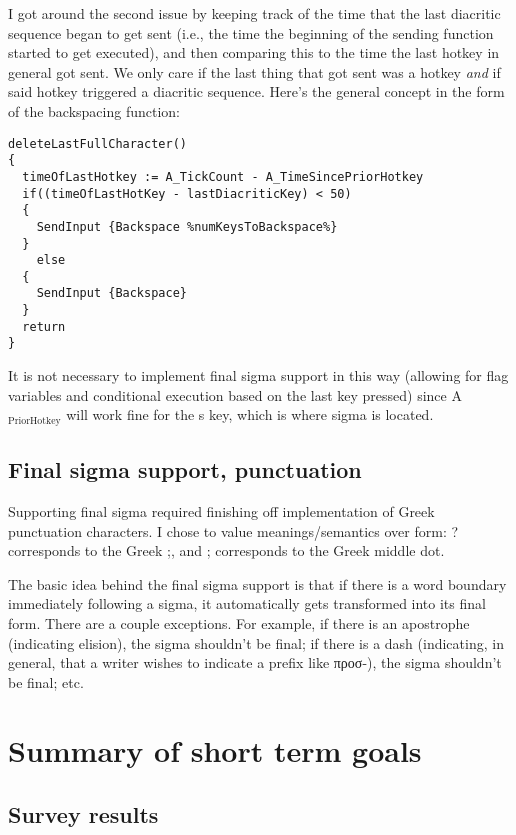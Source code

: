 \documentclass[11pt]{article}
\begin{document}
I got around the second issue by keeping track of the time that the last diacritic sequence began to get sent (i.e., the time the beginning of the sending function started to get executed), and then comparing this to the time the last hotkey in general got sent. We only care if the last thing that got sent was a hotkey \emph{and} if said hotkey triggered a diacritic sequence. Here's the general concept in the form of the backspacing function:

\begin{verbatim}
deleteLastFullCharacter()
{
  timeOfLastHotkey := A_TickCount - A_TimeSincePriorHotkey
  if((timeOfLastHotKey - lastDiacriticKey) < 50)
  {
    SendInput {Backspace %numKeysToBackspace%}
  }
    else
  {
    SendInput {Backspace}
  }
  return
}
\end{verbatim}

It is not necessary to implement final sigma support in this way (allowing for flag variables and conditional execution based on the last key pressed) since A\(_{\text{PriorHotkey}}\) will work fine for the s key, which is where sigma is located.

\subsection{Final sigma support, punctuation}
\label{sec:orga6bafda}

Supporting final sigma required finishing off implementation of Greek punctuation characters. I chose to value meanings/semantics over form: ? corresponds to the Greek ;, and ; corresponds to the Greek middle dot.

The basic idea behind the final sigma support is that if there is a word boundary immediately following a sigma, it automatically gets transformed into its final form. There are a couple exceptions. For example, if there is an apostrophe (indicating elision), the sigma shouldn't be final; if there is a dash (indicating, in general, that a writer wishes to indicate a prefix like προσ-), the sigma shouldn't be final; etc.


\section{Summary of short term goals}
\label{sec:orgbb3d270}

\subsection{Survey results}
\label{sec:org5b67fe8}
\end{document}
